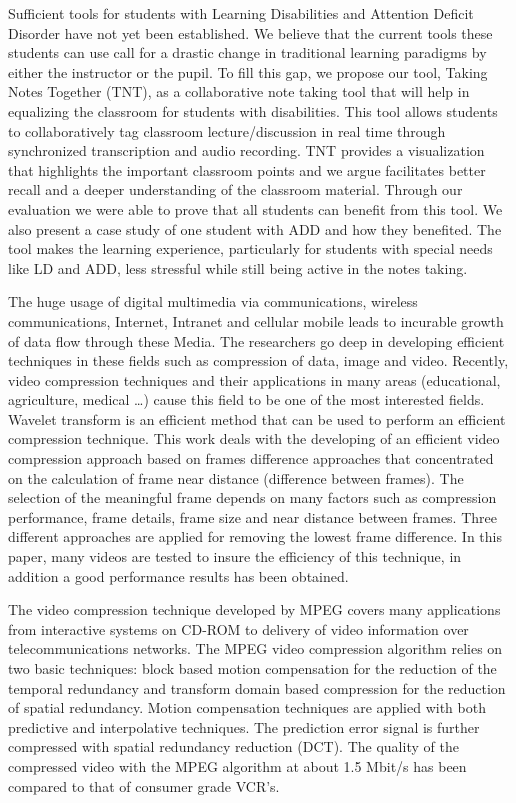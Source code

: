Sufficient tools for students with Learning Disabilities and Attention Deficit Disorder have not yet been established. We believe that the current tools these students can use call for a drastic change in traditional learning paradigms by either the instructor or the pupil. To fill this gap, we propose our tool, Taking Notes Together (TNT), as a collaborative note taking tool that will help in equalizing the classroom for students with disabilities. This tool allows students to collaboratively tag classroom lecture/discussion in real time through synchronized transcription and audio recording. TNT provides a visualization that highlights the important classroom points and we argue facilitates better recall and a deeper understanding of the classroom material. Through our evaluation we were able to prove that all students can benefit from this tool. We also present a case study of one student with ADD and how they benefited. The tool makes the learning experience, particularly for students with special needs like LD and ADD, less stressful while still being active in the notes taking. \cite{Vega2007}




The huge usage of digital multimedia via communications, wireless communications, Internet, Intranet and cellular mobile leads to incurable growth of data flow through these Media. The researchers go deep in developing efficient techniques in these fields such as compression of data, image and video. Recently, video compression techniques and their applications in many areas (educational, agriculture, medical …) cause this field to be one of the most interested fields. Wavelet transform is an efficient method that can be used to perform an efficient compression technique. This work deals with the developing of an efficient video compression approach based on frames difference approaches that concentrated on the calculation of frame near distance (difference between frames). The selection of the meaningful frame depends on many factors such as compression performance, frame details, frame size and near distance between frames. Three different approaches are applied for removing the lowest frame difference. In this paper, many videos are tested to insure the efficiency of this technique, in addition a good performance results has been obtained.\cite{AlAni2011}


The video compression technique developed by MPEG covers many applications from interactive systems on CD-ROM to delivery of video information over telecommunications networks. The MPEG video compression algorithm relies on two basic techniques: block based motion compensation for the reduction of the temporal redundancy and transform domain based compression for the reduction of spatial redundancy. Motion compensation techniques are applied with both predictive and interpolative techniques. The prediction error signal is further compressed with spatial redundancy reduction (DCT). The quality of the compressed video with the MPEG algorithm at about 1.5 Mbit/s has been compared to that of consumer grade VCR's.\cite{LeGall1992}

